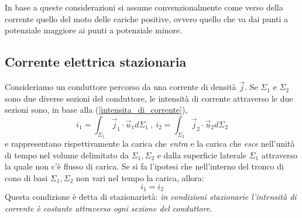 \documentclass[class=book, crop=false, oneside, 12pt]{standalone}
\begin{document}
In base a queste considerazioni si assume convenzionalmente come verso della corrente quello del moto delle cariche positive, ovvero quello che va dai punti a potenziale maggiore ai punti a potenziale minore.

\subsection{Corrente elettrica stazionaria}
Consideriamo un conduttore percorso da una corrente di densità \(\overrightarrow{j}\). 
Se \(\Sigma_1\) e \(\Sigma_2\) sono due diverse sezioni del conduttore, le intensità di corrente attraverso le due sezioni sono, in base alla (\ref{intensita_di_corrente}),
\begin{equation*}
    i_1 = \int_{\Sigma_1} \overrightarrow{j}_1 \cdot \overrightarrow{u}_1 d \Sigma_1 \ , \ i_2 = \int_{\Sigma_2} \overrightarrow{j}_2 \cdot \overrightarrow{u}_2 d \Sigma_2
\end{equation*}
e rappresentano rispettivamente la carica che \emph{entra} e la carica che \emph{esce} nell'unità di tempo nel volume delimitato da \(\Sigma_1, \Sigma_2\) e dalla superficie laterale \(\Sigma_1\) attraverso la quale non c'è flusso di carica. 
Se si fa l'ipotesi che nell'interno del tronco di cono di basi \(\Sigma_1, \Sigma_2\) non vari nel tempo la carica, allora: 
\begin{equation}
    i_1 = i_2
\end{equation}
Questa condizione è detta di stazionarietà: \emph{in condizioni stazionarie l'intensità di corrente è costante attraverso ogni sezione del conduttore}. 
\end{document}
